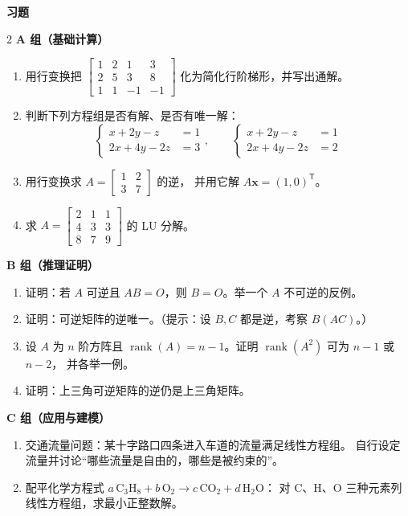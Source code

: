 \documentclass[11pt,a4paper,openany]{ctexbook}
\DeclareMathOperator{\rank}{rank}
\newcommand{\exhead}{%
  \par\addvspace{12pt}%
  {\noindent\sffamily\bfseries\Large\color{qing} 习题\par}%
  \vspace{-4pt}\noindent{\color{qing!32}\rule{\linewidth}{0.7pt}}\par\vspace{6pt}}
\begin{document}
\exhead
\begin{multicols}{2}
\small
\textbf{A 组（基础计算）}
\begin{enumerate}[leftmargin=1.6em, itemsep=3pt]
\item 用行变换把
      $\left[\begin{array}{ccc|c}1&2&1&3\\2&5&3&8\\1&1&-1&-1\end{array}\right]$
      化为简化行阶梯形，并写出通解。
\item 判断下列方程组是否有解、是否有唯一解：
      \[ \left\{\begin{aligned}x+2y-z&=1\\ 2x+4y-2z&=3\end{aligned}\right.,
      \qquad
      \left\{\begin{aligned}x+2y-z&=1\\ 2x+4y-2z&=2\end{aligned}\right. \]
\item 用行变换求 $A=\begin{bmatrix}1&2\\3&7\end{bmatrix}$ 的逆，
      并用它解 $A\boldsymbol{x}=(1,0)^{\mathsf T}$。
\item 求 $A=\begin{bmatrix}2&1&1\\4&3&3\\8&7&9\end{bmatrix}$ 的 LU 分解。
\end{enumerate}
\textbf{B 组（推理证明）}
\begin{enumerate}[leftmargin=1.6em, itemsep=3pt, start=5]
\item 证明：若 $A$ 可逆且 $AB=O$，则 $B=O$。举一个 $A$ 不可逆的反例。
\item 证明：可逆矩阵的逆唯一。（提示：设 $B,C$ 都是逆，考察 $B(AC)$。）
\item 设 $A$ 为 $n$ 阶方阵且 $\rank(A)=n-1$。证明 $\rank(A^2)$ 可为 $n-1$ 或 $n-2$，
      并各举一例。
\item 证明：上三角可逆矩阵的逆仍是上三角矩阵。
\end{enumerate}
\textbf{C 组（应用与建模）}
\begin{enumerate}[leftmargin=1.6em, itemsep=3pt, start=9]
\item 交通流量问题：某十字路口四条进入车道的流量满足线性方程组。
      自行设定流量并讨论“哪些流量是自由的，哪些是被约束的”。
\item 配平化学方程式 $a\,\mathrm{C_3H_8}+b\,\mathrm{O_2}\to c\,\mathrm{CO_2}+d\,\mathrm{H_2O}$：
      对 C、H、O 三种元素列线性方程组，求最小正整数解。
\end{enumerate}
\end{multicols}
\end{document}
